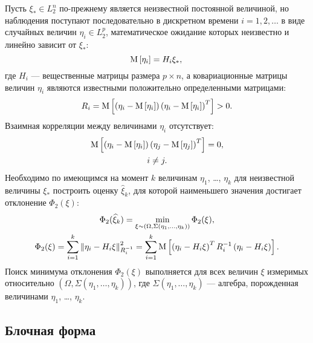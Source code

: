 Пусть $\xi_* \in L_2^n$ по-прежнему является неизвестной постоянной величиной, но наблюдения поступают последовательно в дискретном времени $i = 1, 2, \dots$ в виде
случайных величин $\eta_i \in L_2^p$, математическое ожидание которых неизвестно и линейно зависит от $\xi_*$:
$$
	\mathrm{M} \left [ \eta_i \right ] = H_i \xi_* , \\
$$
где $H_i$ --- вещественные матрицы размера $p \times n$, а ковариационные матрицы величин $\eta_i$ являются известными положительно определенными матрицами:
$$
	R_i = \mathrm{M} \left [ \left ( \eta_i - \mathrm{M} \left [ \eta_i \right ] \right ) \left ( \eta_i - \mathrm{M} \left [ \eta_i \right ] \right )^T \right ] > 0 .
$$
Взаимная корреляции между величинами $\eta_i$ отсутствует:
\begin{gather*}
	\mathrm{M} \left [ \left ( \eta_i - \mathrm{M} \left [ \eta_i \right ] \right ) \left ( \eta_j - \mathrm{M} \left [ \eta_j \right ] \right )^T \right ] = 0 , \\
	i \neq j .
\end{gather*}
Необходимо по имеющимся на момент $k$ величинам $\eta_1$, \dots, $\eta_k$ для неизвестной величины $\xi_*$ построить оценку $\widehat{\xi}_k$, для которой
наименьшего значения достигает отклонение $\Phi_2(\xi)$:
\begin{gather*}
	\Phi_2(\widehat{\xi}_k) = \min_{\xi \sim \left ( \Omega, \Sigma(\eta_1, \dots, \eta_k) \right) } \Phi_2(\xi) , \\
	\Phi_2(\xi)
		= \sum_{i=1}^k \left \| \eta_i - H_i \xi \right \|_{R_i^{-1}}^2
		= \sum_{i=1}^k \mathrm{M} \left [ \left ( \eta_i - H_i \xi \right )^T R_i^{-1} \left ( \eta_i - H_i \xi \right ) \right ] .
\end{gather*}
Поиск минимума отклонения $\Phi_2(\xi)$ выполняется для всех величин $\xi$ измеримых относительно $\left ( \Omega, \Sigma(\eta_1, \dots, \eta_k) \right )$, где
$\Sigma(\eta_1, \dots, \eta_k)$ --- алгебра, порожденная величинами $\eta_1$, \dots, $\eta_k$.

\subsection{Блочная форма}

